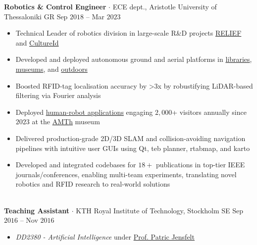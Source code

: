 \documentclass[a4paper,10pt,twoside]{article}
\begin{document}
  \noindent\textbf{Robotics \& Control Engineer} $\cdot$ ECE dept., Aristotle University of Thessaloniki GR \hfill {\small \textcolor{agray}{Sep $2018$ -- Mar $2023$}} \\
  \begin{minipage}[t]{\textwidth}
    \begin{itemize}
      \item Technical Leader of robotics division in large-scale R\&D projects \href{https://relief.web.auth.gr/language/en/home/}{RELIEF} and \href{https://cultureid.web.auth.gr/?page\_id=200&lang=en}{CultureId} \verticalspaceafteritem
      \item Developed and deployed autonomous ground and aerial platforms in \href{https://www.youtube.com/watch?v=bo4lMI640DY}{libraries}, \href{https://youtu.be/2EvTGNOqTrs?t=17}{museums}, and \href{https://www.youtube.com/watch?v=0YFQzpWgEd4}{outdoors}\verticalspaceafteritem
      \item Boosted RFID-tag localisation accuracy by >$3$x by robustifying LiDAR-based filtering via Fourier analysis\verticalspaceafteritem
      \item Deployed \href{https://www.youtube.com/watch?v=mrTL3Gep7Xk&t=36s}{human-robot applications} engaging $2,000$+ visitors annually since $2023$ at the \href{https://www.amth.gr/en}{AMTh} museum \verticalspaceafteritem
      \item Delivered production-grade 2D/3D SLAM and collision-avoiding navigation pipelines with intuitive user GUIs using Qt, teb planner, rtabmap, and karto\verticalspaceafteritem
      \item Developed and integrated codebases for $18+$ publications in top-tier IEEE journals/conferences, enabling multi-team experiments, translating novel robotics and RFID research to real-world solutions
    \end{itemize}
  \end{minipage} \\[0.2em]

  \noindent\textbf{Teaching Assistant} $\cdot$ KTH Royal Institute of Technology, Stockholm SE \hfill {\small \textcolor{agray}{Sep $2016$ -- Nov $2016$}} \\
  \begin{minipage}[t]{\textwidth}
    \begin{itemize}
      \item \textit{DD2380 - Artificial Intelligence} under \href{https://www.kth.se/profile/patric}{Prof. Patric Jensfelt}
    \end{itemize}
  \end{minipage} \\[-1em]
\verticalspacebetweensections
\end{document}
